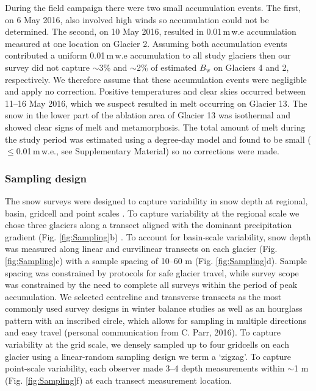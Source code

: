 \documentclass[review,oneside, letterpaper]{igs}
\begin{document}
During the field campaign there were two small accumulation events. The first, on 6 May 2016, also involved high winds so accumulation could not be determined. The second, on 10 May 2016, resulted in 0.01\,m\,w.e accumulation measured at one location on Glacier 2. Assuming both accumulation events contributed a uniform 0.01\,m\,w.e accumulation to all study glaciers then our survey did not capture $\sim$3\% and $\sim$2\% of estimated $B_\mathrm{w}$ on Glaciers 4 and 2, respectively. We therefore assume that these accumulation events were negligible and apply no correction. Positive temperatures and clear skies occurred between 11--16 May 2016, which we suspect resulted in melt occurring on Glacier 13. The snow in the lower part of the ablation area of Glacier 13 was isothermal and showed clear signs of melt and metamorphosis. The total amount of melt during the study period was estimated using a degree-day model and found to be small ($\leq$0.01\,m\,w.e., see Supplementary Material) so no corrections were made.

\subsubsection{Sampling design}

The snow surveys were designed to capture variability in snow depth at regional, basin, gridcell and point scales \citep{Clark2011}. To capture variability at the regional scale we chose three glaciers along a transect aligned with the dominant precipitation gradient  (Fig. \ref{fig:Sampling}b) \citep{Taylor1969}. To account for basin-scale variability, snow depth was measured along linear and curvilinear transects on each glacier (Fig. \ref{fig:Sampling}c) with a sample spacing of 10--60 m (Fig. \ref{fig:Sampling}d). Sample spacing was constrained by protocols for safe glacier travel, while survey scope was constrained by the need to complete all surveys within the period of peak accumulation. We selected centreline and transverse transects as the most commonly used survey designs in winter balance studies \citep[e.g.][]{Kaser2003, Machguth2006} as well as an hourglass pattern with an inscribed circle, which allows for sampling in multiple directions and easy travel (personal communication from C. Parr, 2016). To capture variability at the grid scale, we densely sampled up to four gridcells on each glacier using a linear-random sampling design \citep{Shea2010} we term a `zigzag'. To capture point-scale variability, each observer made 3--4 depth measurements within $\sim$1 m (Fig. \ref{fig:Sampling}f) at each transect measurement location. 
\end{document}
